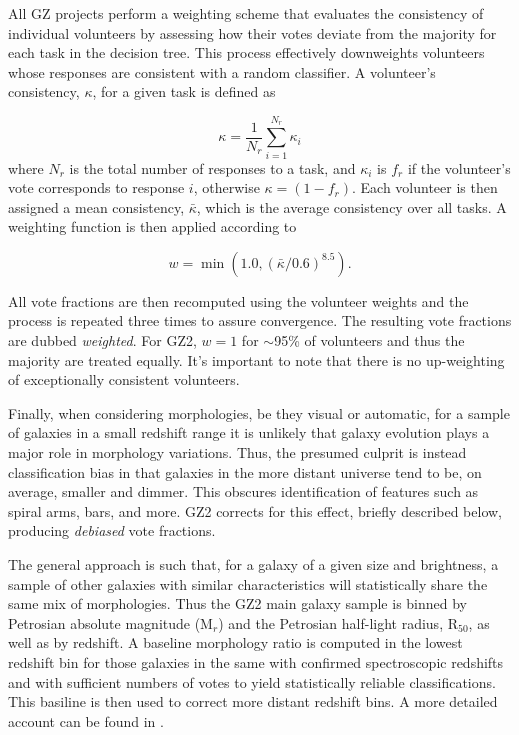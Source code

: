 All GZ projects perform a weighting scheme that evaluates the consistency of individual volunteers by assessing how their votes deviate from the majority for each task in the decision tree. This process effectively downweights volunteers whose responses are consistent with a random classifier. A volunteer's consistency, $\kappa$, for a given task is defined as 

\begin{equation}
\kappa = \frac{1}{N_r}\sum_{i=1}^{N_r}{\kappa_i}
\end{equation}
where $N_r$ is the total number of responses to a task, and $\kappa_i$ is $f_r$ if the volunteer's vote corresponds to response $i$, otherwise $\kappa=(1-f_r)$. Each volunteer is then assigned a mean consistency, $\bar\kappa$, which is the average consistency over all tasks. A weighting function is then applied according to  

\begin{equation}
w = \min({1.0, (\bar\kappa/0.6)^{8.5}}).
\end{equation}

All vote fractions are then recomputed using the volunteer weights and the process is repeated three times to assure convergence. The resulting vote fractions are dubbed \textit{weighted}. For GZ2, $w=1$ for $\sim$95\% of volunteers and thus the majority are treated equally. It's important to note that there is no up-weighting of exceptionally consistent volunteers.


Finally, when considering morphologies, be they visual or automatic, for a sample of galaxies in a small redshift range it is unlikely that galaxy evolution plays a major role in morphology variations. Thus, the presumed culprit is instead classification bias in that galaxies in the more distant universe tend to be, on average, smaller and dimmer. This obscures identification of features such as spiral arms, bars, and more. GZ2 corrects for this effect, briefly described below, producing \textit{debiased} vote fractions.

The general approach is such that, for a galaxy of a given size and brightness, a sample of other galaxies with similar characteristics will statistically share the same mix of morphologies. Thus the GZ2 main galaxy sample is binned by Petrosian absolute magnitude (M$_r$) and the Petrosian half-light radius, R$_{50}$,  as well as by redshift. A baseline morphology ratio is computed in the lowest redshift bin for those galaxies in the same with confirmed spectroscopic redshifts and with sufficient numbers of votes to yield statistically reliable classifications. This basiline is then used to correct more distant redshift bins. A more detailed account can be found in \cite{Willett2013}.

